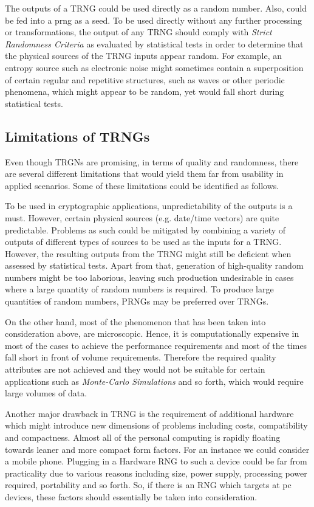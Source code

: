 The outputs of a TRNG could be used directly as a random number. Also, could be fed into a \acrshort{prng} as a seed. To be used directly without any further processing or transformations, the output of any TRNG should comply with \textit{Strict Randomness Criteria} as evaluated by statistical tests in order to determine that the physical sources of the TRNG inputs appear random. For example, an entropy source such as electronic noise might sometimes contain a superposition of certain regular and repetitive structures, such as waves or other periodic phenomena, which might appear to be random, yet would fall short during statistical tests.

\subsection{Limitations of TRNGs}

Even though TRGNs are promising, in terms of quality and randomness, there are several different limitations that would yield them far from usability in applied scenarios. Some of these limitations could be identified as follows.

To be used in cryptographic applications, unpredictability of the outputs is a must. However, certain physical sources (e.g. date/time vectors) are quite predictable. Problems as such could be mitigated by combining a variety of outputs of different types of sources to be used as the inputs for a TRNG. However, the resulting outputs from the TRNG might still be deficient when assessed by statistical tests. Apart from that, generation of high-quality random numbers might be too laborious, leaving such production undesirable in cases where a large quantity of random numbers is required. To produce large quantities of random numbers, PRNGs may be preferred over TRNGs.

On the other hand, most of the phenomenon that has been taken into consideration above, are microscopic. Hence, it is computationally expensive in most of the cases to achieve the performance requirements and most of the times fall short in front of volume requirements. Therefore the required quality attributes are not achieved and they would not be suitable for certain applications such as \textit{Monte-Carlo Simulations} and so forth, which would require large volumes of data.

Another major drawback in TRNG is the requirement of additional hardware which might introduce new dimensions of problems including costs, compatibility and compactness. Almost all of the personal computing is rapidly floating towards leaner and more compact form factors. For an instance we could consider a mobile phone. Plugging in a Hardware RNG to such a device could be far from practicality due to various reasons including size, power supply, processing power required, portability and so forth. So, if there is an RNG which targets at \acrfull{pc} devices, these factors should essentially be taken into consideration.

